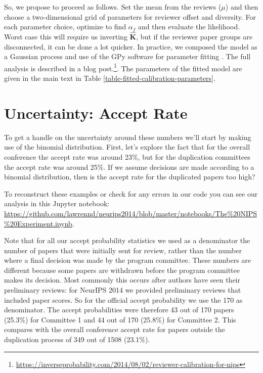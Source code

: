 So, we propose to proceed as follows. Set the mean from the reviews
(\(\mu\)) and then choose a two-dimensional grid of parameters for
reviewer offset and diversity. For each parameter choice, optimize to
find \(\alpha_f\) and then evaluate the likelihood. Worst case this will
require us inverting \(\hat{\mathbf{K}}\), but if the reviewer paper
groups are disconnected, it can be done a lot quicker.  In practice, we composed the model as a Gaussian process and use of the GPy software for parameter fitting \citep{Gpy-2012}. The full
analysis is described in a blog post.\footnote{\url{https://inverseprobability.com/2014/08/02/reviewer-calibration-for-nips}}.  The parameters of the fitted model are given in the main text in
Table \ref{table-fitted-calibration-parameters}.


\section{Uncertainty: Accept Rate}\label{uncertainty-accept-rate}

To get a handle on the uncertainty around these numbers we'll start by
making use of the
binomial distribution.
First, let's explore the fact that for the overall conference the accept
rate was around 23\%, but for the duplication committees the accept rate
was around 25\%. If we assume decisions are made according to a binomial
distribution, then is the accept rate for the duplicated papers too
high?

To reconstruct these examples or check for any errors in our code you can see our analysis in this Jupyter notebook: \url{https://github.com/lawrennd/neurips2014/blob/master/notebooks/The%20NIPS%20Experiment.ipynb}.

Note that for all our accept probability statistics we used as a
denominator the number of papers that were initially sent for review,
rather than the number where a final decision was made by the program
committee. These numbers are different because some papers are withdrawn
before the program committee makes its decision. Most commonly this
occurs after authors have seen their preliminary reviews: for NeurIPS 2014
we provided preliminary reviews that included paper scores. So for the
official accept probability we use the 170 as denominator. The accept
probabilities were therefore 43 out of 170 papers (25.3\%) for Committee
1 and 44 out of 170 (25.8\%) for Committee 2. This compares with the
overall conference accept rate for papers outside the duplication
process of 349 out of 1508 (23.1\%).

